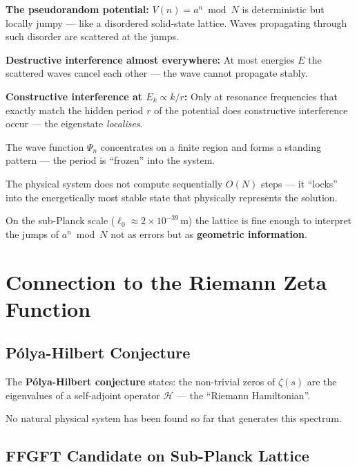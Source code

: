 \textbf{The pseudorandom potential:}
$V(n) = a^n \bmod N$ is deterministic but
locally jumpy --- like a disordered solid-state lattice.
Waves propagating through such disorder
are scattered at the jumps.

\textbf{Destructive interference almost everywhere:}
At most energies $E$ the scattered waves cancel each other ---
the wave cannot propagate stably.

\textbf{Constructive interference at $E_k \propto k/r$:}
Only at resonance frequencies that exactly match the
hidden period $r$ of the potential
does constructive interference occur ---
the eigenstate \emph{localises}.

\begin{foundation}
The wave function $\Psi_n$ concentrates
on a finite region and forms a
standing pattern --- the period is
``frozen'' into the system.

The physical system does not compute sequentially
$O(N)$ steps --- it ``locks'' into the
energetically most stable state
that physically represents the solution.

On the sub-Planck scale ($\ell_0 \approx 2 \times 10^{-39}$\,m)
the lattice is fine enough to interpret the jumps of
$a^n \bmod N$ not as errors but as
\textbf{geometric information}.
\end{foundation}

\section{Connection to the Riemann Zeta Function}
\label{sec:zeta}

\subsection{Pólya-Hilbert Conjecture}

The \textbf{Pólya-Hilbert conjecture} states:
the non-trivial zeros of $\zeta(s)$
are the eigenvalues of a self-adjoint
operator $\mathcal{H}$ --- the
``Riemann Hamiltonian''.

No natural physical system has been found so far
that generates this spectrum.

\subsection{FFGFT Candidate on Sub-Planck Lattice}

